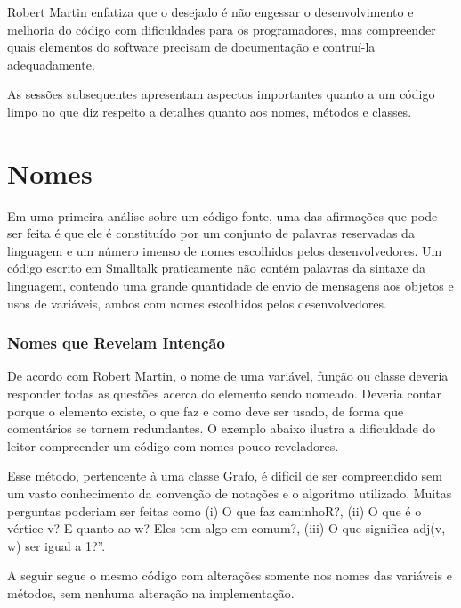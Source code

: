Robert Martin enfatiza que o desejado é não engessar o desenvolvimento e melhoria do código com dificuldades para os programadores, mas compreender quais elementos do software precisam de documentação e contruí-la adequadamente.

\vskip 1.0cm
As sessões subsequentes apresentam aspectos importantes quanto a um código limpo no que diz respeito a detalhes quanto aos nomes, métodos e classes.

\section{Nomes}
\label{sec:nomes}

Em uma primeira análise sobre um código-fonte, uma das afirmações que pode ser feita é que ele é constituído por um conjunto de palavras reservadas da linguagem e um número imenso de nomes escolhidos pelos desenvolvedores. Um código escrito em Smalltalk praticamente não contém palavras da sintaxe da linguagem, contendo uma grande quantidade de envio de mensagens aos objetos e usos de variáveis, ambos com nomes escolhidos pelos desenvolvedores.

\subsubsection{Nomes que Revelam Intenção}
De acordo com Robert Martin, o nome de uma variável, função ou classe deveria responder todas as questões acerca do elemento sendo nomeado. Deveria contar porque o elemento existe, o que faz e como deve ser usado, de forma que comentários se tornem redundantes. O exemplo abaixo ilustra a dificuldade do leitor compreender um código com nomes pouco reveladores.



Esse método, pertencente à uma classe Grafo, é difícil de ser compreendido sem um vasto conhecimento da convenção de notações e o algoritmo utilizado. Muitas perguntas poderiam ser feitas como (i) O que faz caminhoR?,  (ii) O que é o vértice v?  E quanto ao w? Eles tem algo em comum?, (iii)  O que significa adj(v, w) ser igual a 1?”.

A seguir segue o mesmo código com alterações somente nos nomes das variáveis e métodos, sem nenhuma alteração na implementação.



